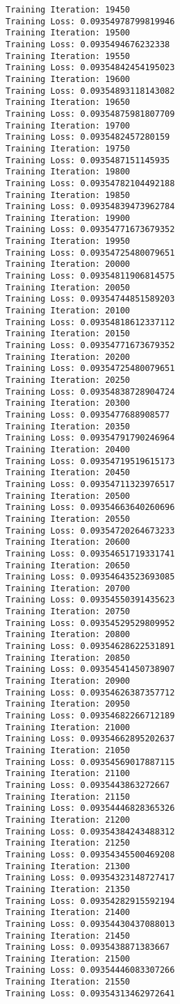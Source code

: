 \documentclass[11pt]{article}
\begin{document}
\begin{Verbatim}[commandchars=\\\{\}]
Training Iteration: 19450
Training Loss: 0.09354978799819946
Training Iteration: 19500
Training Loss: 0.0935494676232338
Training Iteration: 19550
Training Loss: 0.09354842454195023
Training Iteration: 19600
Training Loss: 0.09354893118143082
Training Iteration: 19650
Training Loss: 0.09354875981807709
Training Iteration: 19700
Training Loss: 0.0935482457280159
Training Iteration: 19750
Training Loss: 0.0935487151145935
Training Iteration: 19800
Training Loss: 0.09354782104492188
Training Iteration: 19850
Training Loss: 0.09354839473962784
Training Iteration: 19900
Training Loss: 0.09354771673679352
Training Iteration: 19950
Training Loss: 0.09354725480079651
Training Iteration: 20000
Training Loss: 0.09354811906814575
Training Iteration: 20050
Training Loss: 0.09354744851589203
Training Iteration: 20100
Training Loss: 0.09354818612337112
Training Iteration: 20150
Training Loss: 0.09354771673679352
Training Iteration: 20200
Training Loss: 0.09354725480079651
Training Iteration: 20250
Training Loss: 0.09354838728904724
Training Iteration: 20300
Training Loss: 0.0935477688908577
Training Iteration: 20350
Training Loss: 0.09354791790246964
Training Iteration: 20400
Training Loss: 0.09354719519615173
Training Iteration: 20450
Training Loss: 0.09354711323976517
Training Iteration: 20500
Training Loss: 0.09354663640260696
Training Iteration: 20550
Training Loss: 0.09354720264673233
Training Iteration: 20600
Training Loss: 0.09354651719331741
Training Iteration: 20650
Training Loss: 0.09354643523693085
Training Iteration: 20700
Training Loss: 0.09354550391435623
Training Iteration: 20750
Training Loss: 0.09354529529809952
Training Iteration: 20800
Training Loss: 0.09354628622531891
Training Iteration: 20850
Training Loss: 0.09354541450738907
Training Iteration: 20900
Training Loss: 0.09354626387357712
Training Iteration: 20950
Training Loss: 0.09354682266712189
Training Iteration: 21000
Training Loss: 0.09354662895202637
Training Iteration: 21050
Training Loss: 0.09354569017887115
Training Iteration: 21100
Training Loss: 0.0935443863272667
Training Iteration: 21150
Training Loss: 0.09354446828365326
Training Iteration: 21200
Training Loss: 0.09354384243488312
Training Iteration: 21250
Training Loss: 0.09354345500469208
Training Iteration: 21300
Training Loss: 0.09354323148727417
Training Iteration: 21350
Training Loss: 0.09354282915592194
Training Iteration: 21400
Training Loss: 0.09354430437088013
Training Iteration: 21450
Training Loss: 0.0935438871383667
Training Iteration: 21500
Training Loss: 0.09354446083307266
Training Iteration: 21550
Training Loss: 0.09354313462972641

\end{Verbatim}
\end{document}
